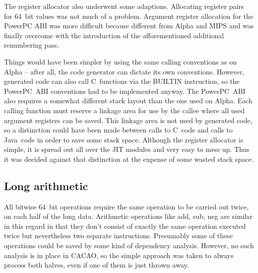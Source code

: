The register allocator also underwent some adaptions. Allocating register pairs
for 64~bit values was not much of a problem. Argument register allocation for
the PowerPC ABI was more difficult because different from Alpha and MIPS and
was finally overcome with the introduction of the afforementioned additional
renumbering pass.

Things would have been simpler by using the same calling conventions as on
Alpha -- after all, the code generator can dictate its own conventions.
However, generated code can also call C~functions via the BUILTIN instruction,
so the PowerPC~ABI conventions had to be implemented anyway. The PowerPC~ABI
also requires a somewhat different stack layout than the one used on Alpha.
Each calling function must reserve a linkage area for use by the callee where
all used argument registers can be saved. This linkage area is not used by
generated code, so a distinction could have been made between calls to C~code
and calls to Java~code in order to save some stack space. Although the register
allocator is simple, it is spread out all over the JIT modules and very easy to
mess up. Thus it was decided against that distinction at the expense of some
wasted stack space.

\subsection{Long arithmetic}

All bitwise 64~bit operations require the same operation to be carried out
twice, on each half of the long data. Arithmetic operations like add, sub, neg
are similar in this regard in that they don't consist of exactly the same
operation executed twice but nevertheless two separate instructions. Presumably
some of these operations could be saved by some kind of dependency analysis.
However, no such analysis is in place in CACAO, so the simple approach was
taken to always process both halves, even if one of them is just thrown away.
